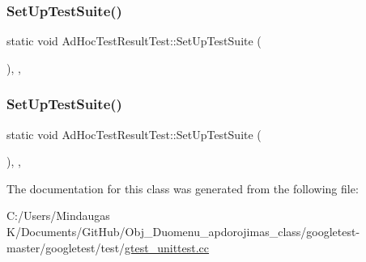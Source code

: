 \mbox{\label{class_ad_hoc_test_result_test_a4a66200ff2ff1cdaddd299dd006351f6}} 
\subsubsection{\texorpdfstring{SetUpTestSuite()}{SetUpTestSuite()}\hspace{0.1cm}{\footnotesize\ttfamily [1/2]}}
{\footnotesize\ttfamily static void Ad\+Hoc\+Test\+Result\+Test\+::\+Set\+Up\+Test\+Suite (\begin{DoxyParamCaption}{ }\end{DoxyParamCaption})\hspace{0.3cm}{\ttfamily [inline]}, {\ttfamily [static]}, {\ttfamily [protected]}}

\mbox{\label{class_ad_hoc_test_result_test_a4a66200ff2ff1cdaddd299dd006351f6}} 
\subsubsection{\texorpdfstring{SetUpTestSuite()}{SetUpTestSuite()}\hspace{0.1cm}{\footnotesize\ttfamily [2/2]}}
{\footnotesize\ttfamily static void Ad\+Hoc\+Test\+Result\+Test\+::\+Set\+Up\+Test\+Suite (\begin{DoxyParamCaption}{ }\end{DoxyParamCaption})\hspace{0.3cm}{\ttfamily [inline]}, {\ttfamily [static]}, {\ttfamily [protected]}}



The documentation for this class was generated from the following file\+:\begin{DoxyCompactItemize}
\item 
C\+:/\+Users/\+Mindaugas K/\+Documents/\+Git\+Hub/\+Obj\+\_\+\+Duomenu\+\_\+apdorojimas\+\_\+class/googletest-\/master/googletest/test/\mbox{\hyperlink{googletest-master_2googletest_2test_2gtest__unittest_8cc}{gtest\+\_\+unittest.\+cc}}\end{DoxyCompactItemize}

